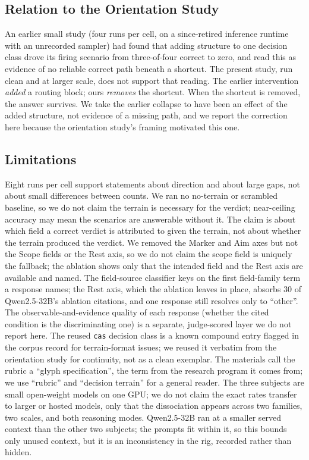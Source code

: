 \documentclass[11pt,a4paper]{article}
\begin{document}
\subsection{Relation to the Orientation Study}\label{sec:orientation}

An earlier small study (four runs per cell, on a since-retired inference runtime
with an unrecorded sampler) had found that adding structure to one decision class
drove its firing scenario from three-of-four correct to zero, and read this as
evidence of no reliable correct path beneath a shortcut. The present study, run
clean and at larger scale, does not support that reading. The earlier
intervention \emph{added} a routing block; ours \emph{removes} the shortcut. When
the shortcut is removed, the answer survives. We take the earlier collapse to have
been an effect of the added structure, not evidence of a missing path, and we
report the correction here because the orientation study's framing motivated this
one.

\subsection{Limitations}\label{sec:limitations}

Eight runs per cell support statements about direction and about large gaps, not
about small differences between counts. We ran no no-terrain or scrambled
baseline, so we do not claim the terrain is necessary for the verdict; near-ceiling
accuracy may mean the scenarios are answerable without it. The claim is about which
field a correct verdict is attributed to given the terrain, not about whether the
terrain produced the verdict. We removed the Marker and Aim axes but not the Scope
fields or the Rest axis, so we do not claim the scope field is uniquely the
fallback; the ablation shows only that the intended field and the Rest axis are
available and named. The field-source classifier keys on the first field-family
term a response names; the Rest axis, which the ablation leaves in place, absorbs
30 of Qwen2.5-32B's ablation citations, and one response still resolves only to
``other''. The observable-and-evidence quality of each response (whether the cited
condition is the discriminating one) is a separate, judge-scored layer we do not
report here. The reused \texttt{cas} decision class is a known compound entry
flagged in the corpus record for terrain-format issues; we reused it verbatim from
the orientation study for continuity, not as a clean exemplar. The materials call
the rubric a ``glyph specification'', the term from the research program it comes
from; we use ``rubric'' and ``decision terrain'' for a general reader. The three
subjects are small open-weight models on one GPU; we do not claim the exact rates
transfer to larger or hosted models, only that the dissociation appears across two
families, two scales, and both reasoning modes. Qwen2.5-32B ran at a smaller served
context than the other two subjects; the prompts fit within it, so this bounds only
unused context, but it is an inconsistency in the rig, recorded rather than hidden.
\end{document}
